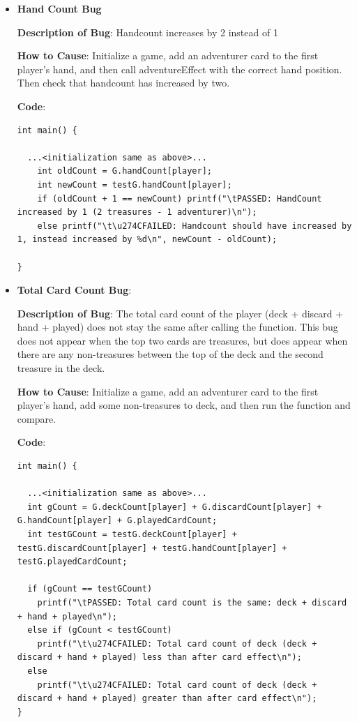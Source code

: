 \documentclass[11pt,letterpaper]{article}
\begin{document}
\begin{enumerate}[label=\Roman*.]
\begin{enumerate}
\begin{itemize}[leftmargin=*]
        \item \textbf{Hand Count Bug}

        \textbf{Description of Bug}: Handcount increases by 2 instead of 1

        \textbf{How to Cause}: Initialize a game, add an adventurer card to 
          the first player's hand, and then call adventureEffect with the correct
          hand position. Then check that handcount has increased by two.

        \textbf{Code}:
          \begin{lstlisting}
int main() {

  ...<initialization same as above>...
    int oldCount = G.handCount[player];
    int newCount = testG.handCount[player];
    if (oldCount + 1 == newCount) printf("\tPASSED: HandCount increased by 1 (2 treasures - 1 adventurer)\n"); 
    else printf("\t\u274CFAILED: Handcount should have increased by 1, instead increased by %d\n", newCount - oldCount);

}
          \end{lstlisting}

        \item \textbf{Total Card Count Bug}:

          \textbf{Description of Bug}: The total card count of the player (deck + discard + hand + played)
            does not stay the same after calling the function. This bug does not appear when the top
            two cards are treasures, but does appear when there are any non-treasures between the top
            of the deck and the second treasure in the deck.

        \textbf{How to Cause}: Initialize a game, add an adventurer card to the first player's hand, 
            add some non-treasures to deck, and then run the function and compare. 

        \textbf{Code}:
          \begin{lstlisting}
int main() {

  ...<initialization same as above>...
  int gCount = G.deckCount[player] + G.discardCount[player] + G.handCount[player] + G.playedCardCount;
  int testGCount = testG.deckCount[player] + testG.discardCount[player] + testG.handCount[player] + testG.playedCardCount;
  
  if (gCount == testGCount)
    printf("\tPASSED: Total card count is the same: deck + discard + hand + played\n");
  else if (gCount < testGCount)
    printf("\t\u274CFAILED: Total card count of deck (deck + discard + hand + played) less than after card effect\n"); 
  else
    printf("\t\u274CFAILED: Total card count of deck (deck + discard + hand + played) greater than after card effect\n");
}
          \end{lstlisting}


\end{itemize}
\end{enumerate}
\end{enumerate}
\end{document}

